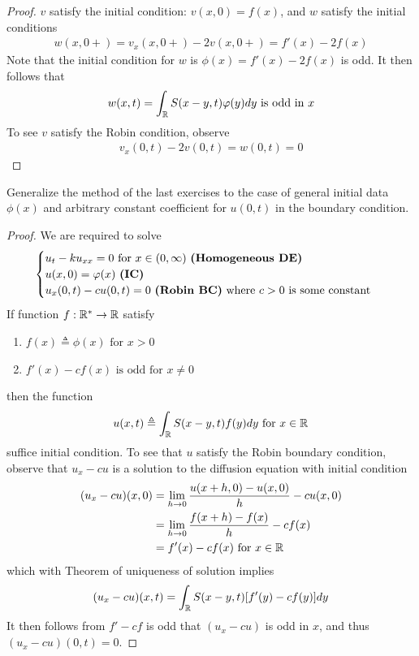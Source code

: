 \documentclass{report}
\begin{document}
\begin{proof}
$v$ satisfy the initial condition:  $v(x,0)=f(x)$, and $w$ satisfy the initial conditions 
\begin{align*}
w(x,0+)=v_x(x,0+)-2v(x,0+)=f'(x)-2f(x) 
\end{align*}
Note that the initial condition for $w$ is  $\phi (x)=f'(x)-2f(x)$ is odd. It then follows that 
\begin{align*}
w(x,t)=\int_{\R} S(x-y,t)\phi (y)dy\text{ is odd in }x
\end{align*}
To see $v$ satisfy the Robin condition, observe 
 \begin{align*}
v_x(0,t)-2v(0,t)=w(0,t)=0
\end{align*}
\end{proof}
\begin{question}{}{}
Generalize the method of the last exercises to the case of general initial data $\phi (x)$ and arbitrary constant coefficient for $u(0,t)$ in the boundary condition. 
\end{question}
\begin{proof}
We are required to solve 
\begin{align*}
\begin{cases}
  u_t-ku_{xx}=0\text{ for }x\in (0,\infty)\text{ \textbf{(Homogeneous DE)} }\\
u(x,0)=\phi (x)\text{ \textbf{(IC)} }\\
u_x(0,t)-cu(0,t)=0\text{ \textbf{(Robin BC)} where $c>0$ is some constant }
\end{cases}
\end{align*}
If function $f:\R^*\rightarrow \R$ satisfy 
\begin{enumerate}[label=(\alph*)]
  \item $f(x)\triangleq \phi (x)\text{ for }x>0$
  \item $f'(x)-cf(x)\text{ is odd for $x\neq 0$}$
\end{enumerate}
then the function 
\begin{align*}
u(x,t)\triangleq \int_{\R} S(x-y,t)f(y)dy\text{ for }x\inr
\end{align*}
suffice initial condition. To see that $u$ satisfy the Robin boundary condition, observe that $u_x-cu$ is a solution to the diffusion equation with initial condition 
 \begin{align*}
   (u_x-cu)(x,0)&=\lim_{h\to 0}\frac{u(x+h,0)-u(x,0)}{h}-cu(x,0)\\
   &= \lim_{h\to 0} \frac{f(x+h)-f(x)}{h}-cf(x)\\
   &=f'(x)-cf(x)\text{ for }x\inr
\end{align*}
which with Theorem of uniqueness of solution implies 
\begin{align*}
  (u_x-cu)(x,t)=\int_{\R}S(x-y,t) [f'(y)-cf(y)]dy
\end{align*}
It then follows from $f'-cf$ is odd that  $(u_x-cu)$ is odd in $x$, and thus $(u_x-cu)(0,t)=0$. 
\end{proof}
\end{document}
